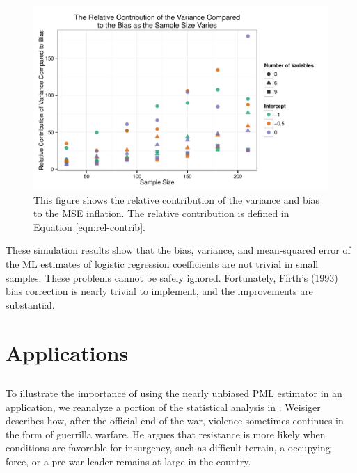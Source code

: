 \documentclass[12pt]{article}
\begin{document}
\begin{figure}[h]
\begin{center}
\includegraphics[scale = 0.7]{figs/relcontrib-n-scatter.pdf}
\caption{This figure shows the relative contribution of the variance and bias to the MSE inflation. The relative contribution is defined in Equation \ref{eqn:rel-contrib}.}\label{fig:relcontrib-n-scatter}
\end{center}
\end{figure}

These simulation results show that the bias, variance, and mean-squared error of the ML estimates of logistic regression coefficients are not trivial in small samples. 
These problems cannot be safely ignored. 
Fortunately, Firth's (1993) bias correction is nearly trivial to implement, and the improvements are substantial. 

\section*{Applications}

\subsection*{\cite{Weisiger2014}}

To illustrate the importance of using the nearly unbiased PML estimator in an application, we reanalyze a portion of the statistical analysis in \cite{Weisiger2014}. 
Weisiger describes how, after the official end of the war, violence sometimes continues in the form of guerrilla warfare. 
He argues that resistance is more likely when conditions are favorable for insurgency, such as difficult terrain, a occupying force, or a pre-war leader remains at-large in the country. 
\end{document}
